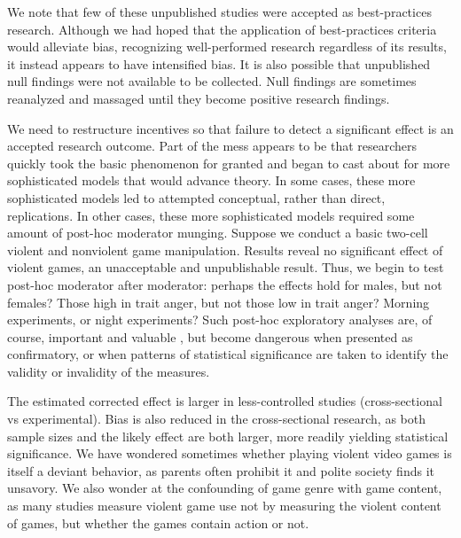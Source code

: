 \documentclass[man]{apa6}
\begin{document}
We note that few of these unpublished studies were accepted as best-practices research. Although we had hoped that the application of best-practices criteria would alleviate bias, recognizing well-performed research regardless of its results, it instead appears to have intensified bias. It is also possible that unpublished null findings were not available to be collected. Null findings are sometimes reanalyzed and massaged until they become positive research findings.



We need to restructure incentives so that failure to detect a significant effect is an accepted research outcome. %
Part of the mess appears to be that researchers quickly took the basic phenomenon for granted and began to cast about for more sophisticated models that would advance theory. In some cases, these more sophisticated models led to attempted conceptual, rather than direct, replications. In other cases, these more sophisticated models required some amount of post-hoc moderator munging. Suppose we conduct a basic two-cell violent and nonviolent game manipulation. Results reveal no significant effect of violent games, an unacceptable and unpublishable result. Thus, we begin to test post-hoc moderator after moderator: perhaps the effects hold for males, but not females? Those high in trait anger, but not those low in trait anger? Morning experiments, or night experiments? Such post-hoc exploratory analyses are, of course, important and valuable \citep[indeed, we present them ourselves in][]{Engelhardt:etal:2014}, but become dangerous when presented as confirmatory, or when patterns of statistical significance are taken to identify the validity or invalidity of the measures.

The estimated corrected effect is larger in less-controlled studies (cross-sectional vs experimental). Bias is also reduced in the cross-sectional research, as both sample sizes and the likely effect are both larger, more readily yielding statistical significance. 
We have wondered sometimes whether playing violent video games is itself a deviant behavior, as parents often prohibit it and polite society finds it unsavory. We also wonder at the confounding of game genre with game content, as many studies %
measure violent game use not by measuring the violent content of games, but whether the games contain action or not.
\end{document}
